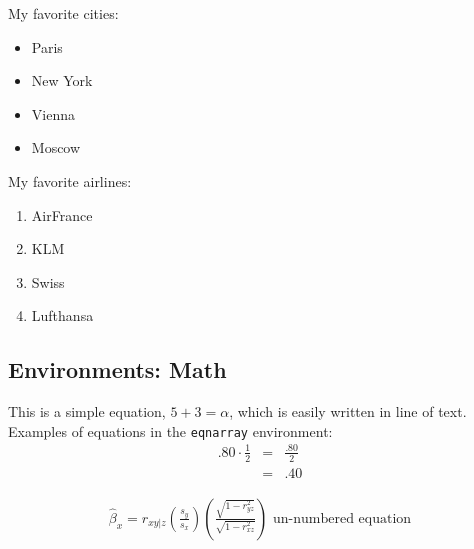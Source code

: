 \documentclass[10pt]{article}
\begin{document}
\noindent My favorite cities:
\begin{itemize}
\item Paris
\item New York
\item Vienna
\item Moscow
\end{itemize}

\noindent My favorite airlines:
\begin{enumerate}
\item AirFrance
\item KLM
\item Swiss
\item Lufthansa
\end{enumerate}

\subsection*{Environments: Math}

This is a simple equation, $5 + 3 = \alpha$, which is easily written in line of text. \\

\noindent Examples of equations in the {\tt eqnarray} environment:
\begin{eqnarray}
.80 \cdot \frac{1}{2} & = & \frac{.80}{2} \\
& = & .40
\end{eqnarray}

\begin{eqnarray*}
\hat{\beta}_x = r_{xy|z} \left(\frac{s_y}{s_x} \right) \left(\frac{\sqrt{1-r^2_{yz}}}{\sqrt{1-r^2_{xz}}} \right)
\mbox{ un-numbered equation}
\end{eqnarray*}
\end{document}
